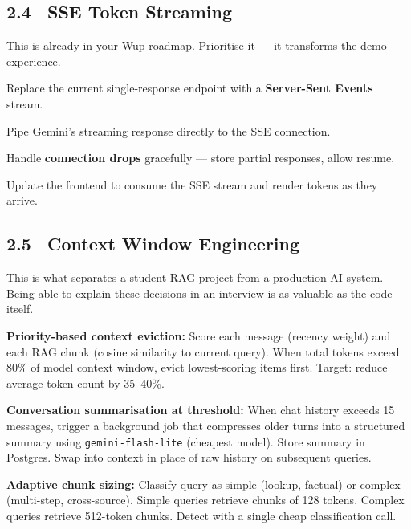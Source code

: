 \documentclass[11pt, a4paper]{article}
\DeclareRobustCommand{\badge}[2]{%
  \tikz[baseline=(n.base)]{
    \node[inner sep=3pt, rounded corners=3pt,
          fill=#1!15, text=#1!70!black,
          font=\fontsize{8}{8}\selectfont\bfseries] (n) {#2};
  }%
}
\DeclareRobustCommand{\critical}{\badge{danger}{CRITICAL}}
\DeclareRobustCommand{\high}{\badge{warning}{HIGH}}
\begin{document}
\subsection{2.4 \ SSE Token Streaming \hfill \critical}

This is already in your Wup roadmap. Prioritise it — it transforms the demo experience.

\begin{checklist}
  \item Replace the current single-response endpoint with a \textbf{Server-Sent Events} stream.
  \item Pipe Gemini's streaming response directly to the SSE connection.
  \item Handle \textbf{connection drops} gracefully — store partial responses, allow resume.
  \item Update the frontend to consume the SSE stream and render tokens as they arrive.
\end{checklist}

\subsection{2.5 \ Context Window Engineering \hfill \high}

\begin{infobox}
This is what separates a student RAG project from a production AI system. Being able to explain these decisions in an interview is as valuable as the code itself.
\end{infobox}

\begin{checklist}
  \item \textbf{Priority-based context eviction:} Score each message (recency weight) and each RAG chunk (cosine similarity to current query). When total tokens exceed 80\% of model context window, evict lowest-scoring items first. Target: reduce average token count by 35--40\%.

  \item \textbf{Conversation summarisation at threshold:} When chat history exceeds 15 messages, trigger a background job that compresses older turns into a structured summary using \texttt{gemini-flash-lite} (cheapest model). Store summary in Postgres. Swap into context in place of raw history on subsequent queries.

  \item \textbf{Adaptive chunk sizing:} Classify query as simple (lookup, factual) or complex (multi-step, cross-source). Simple queries retrieve chunks of 128 tokens. Complex queries retrieve 512-token chunks. Detect with a single cheap classification call.
\end{checklist}
\end{document}
